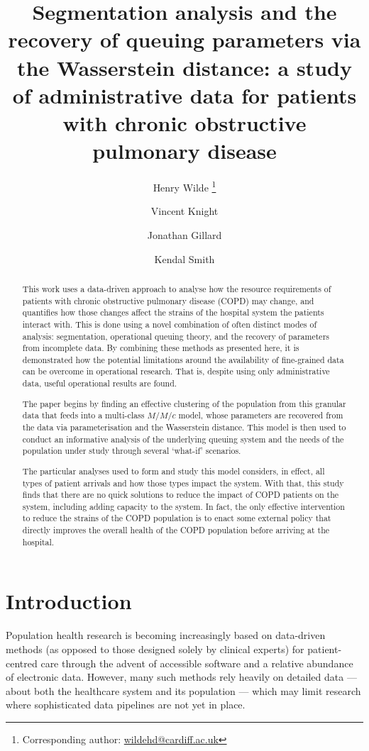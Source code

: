 \documentclass[11pt]{article}
\title{%
    Segmentation analysis and the recovery of queuing parameters via the
    Wasserstein distance: a study of administrative data for patients with
    chronic obstructive pulmonary disease
}
\author[a]{%
    Henry Wilde \footnote{Corresponding author: \url{wildehd@cardiff.ac.uk}}%
}
\author[a]{Vincent Knight}
\author[a]{Jonathan Gillard}
\author[b]{Kendal Smith}
\affil[a]{School of Mathematics, Cardiff University}
\affil[b]{Cwm Taf Morgannwg University Health Board}
\date{}
\begin{document}
\maketitle%

\begin{abstract}
    This work uses a data-driven approach to analyse how the resource
    requirements of patients with chronic obstructive pulmonary disease (COPD)
    may change, and quantifies how those changes affect the strains of the
    hospital system the patients interact with. This is done using a novel
    combination of often distinct modes of analysis: segmentation, operational
    queuing theory, and the recovery of parameters from incomplete data. By
    combining these methods as presented here, it is demonstrated how the
    potential limitations around the availability of fine-grained data can be
    overcome in operational research. That is, despite using only administrative
    data, useful operational results are found.

    The paper begins by finding an effective clustering of the population from
    this granular data that feeds into a multi-class \(M/M/c\) model, whose
    parameters are recovered from the data via parameterisation and the
    Wasserstein distance. This model is then used to conduct an informative
    analysis of the underlying queuing system and the needs of the population
    under study through several `what-if' scenarios.

    The particular analyses used to form and study this model considers, in
    effect, all types of patient arrivals and how those types impact the system.
    With that, this study finds that there are no quick solutions to reduce the
    impact of COPD patients on the system, including adding capacity to the
    system. In fact, the only effective intervention to reduce the strains of
    the COPD population is to enact some external policy that directly improves
    the overall health of the COPD population before arriving at the hospital.
\end{abstract}

\section{Introduction}\label{sec:intro}

Population health research is becoming increasingly based on data-driven methods
(as opposed to those designed solely by clinical experts) for patient-centred
care through the advent of accessible software and a relative abundance of
electronic data. However, many such methods rely heavily on detailed data ---
about both the healthcare system and its population --- which may limit research
where sophisticated data pipelines are not yet in place.
\end{document}
